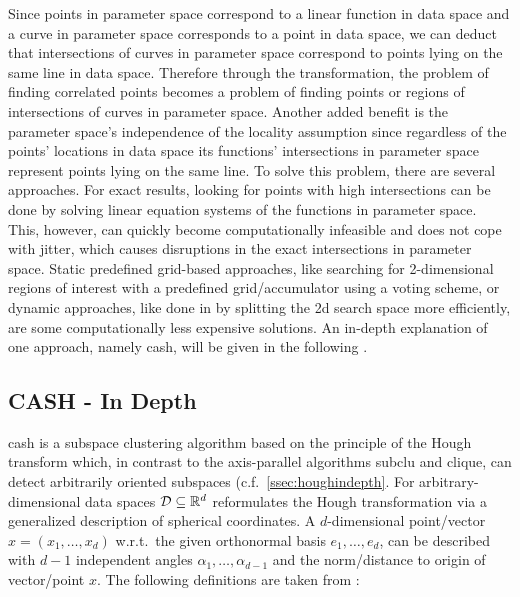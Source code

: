 Since points in parameter space correspond to a linear function in data space and a curve in parameter space corresponds to a point in data space, we can deduct that intersections of curves in parameter space correspond to points lying on the same line in data space. Therefore through the transformation, the problem of finding correlated points becomes a problem of finding points or regions of intersections of curves in parameter space. 
Another added benefit is the parameter space's independence of the locality assumption since regardless of the points' locations in data space its functions' intersections in parameter space represent points lying on the same line.  
To solve this problem, there are several approaches. 
For exact results, looking for points with high intersections can be done by solving linear equation systems of the functions in parameter space. 
This, however, can quickly become computationally infeasible and does not cope with jitter, which causes disruptions in the exact intersections in parameter space. 
Static predefined grid-based approaches, like searching for 2-dimensional regions of interest with a predefined grid/accumulator using a voting scheme, or dynamic approaches, like done in \textcite{CASHachtert2008global} by splitting the 2d search space more efficiently, are some computationally less expensive solutions. 
An in-depth explanation of one approach, namely \acrfull{cash}, will be given in the following .

\subsection{CASH - In Depth}\label{ssec:CASHindepth}
\acrfull{cash} is a subspace clustering algorithm based on the principle of the Hough transform which, in contrast to the axis-parallel algorithms \acrshort{subclu}\cite{sublcukailing2004density} and \acrshort{clique}\cite{cliqueagrawal1998automatic}, can detect arbitrarily oriented subspaces (c.f.~\autoref{ssec:houghindepth}. 
For arbitrary-dimensional data spaces $\mathcal{D} \subseteq \mathbb{R}^d$ \textcite{CASHachtert2008robust} reformulates the Hough transformation via a generalized description of spherical coordinates. A $d$-dimensional point/vector $x=(x_1,\dotsc,x_d)$ w.r.t.\ the given orthonormal basis $e_1,\dotsc,e_d$, can be described with $d-1$ independent angles $\alpha_1,\dotsc,\alpha_{d-1}$ and the norm/distance to origin of vector/point $x$. The following definitions are taken from \cite{CASHachtert2008robust}:

